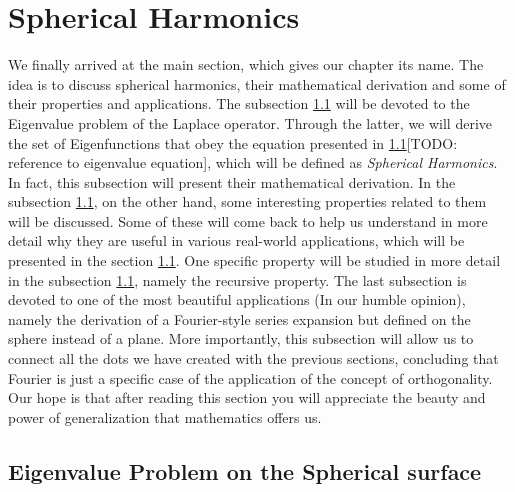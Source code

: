 
\section{Spherical Harmonics}
We finally arrived at the main section, which gives our chapter its name. The idea is to discuss spherical harmonics, their mathematical derivation and some of their properties and applications.\newline
The subsection \ref{} will be devoted to the Eigenvalue problem of the Laplace operator. Through the latter, we will derive the set of Eigenfunctions that obey the equation presented in \ref{}[TODO: reference to eigenvalue equation], which will be defined as \emph{Spherical Harmonics}. In fact, this subsection will present their mathematical derivation.\newline
In the subsection \ref{}, on the other hand, some interesting properties related to them will be discussed. Some of these will come back to help us understand in more detail why they are useful in various real-world applications, which will be presented in the section \ref{}.\newline
One specific property will be studied in more detail in the subsection \ref{}, namely the recursive property.
The last subsection is devoted to one of the most beautiful applications (In our humble opinion), namely the derivation of a Fourier-style series expansion but defined on the sphere instead of a plane.\newline 
More importantly, this subsection will allow us to connect all the dots we have created with the previous sections, concluding that Fourier is just a specific case of the application of the concept of orthogonality.\newline
Our hope is that after reading this section you will appreciate the beauty and power of generalization that mathematics offers us.

\subsection{Eigenvalue Problem on the Spherical surface}
